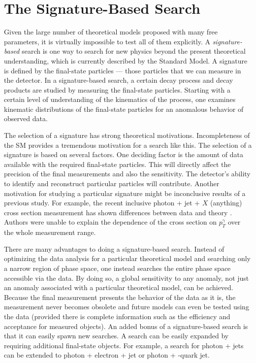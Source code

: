 \section{The Signature-Based Search}
Given the large number of theoretical models proposed with many free parameters, it is virtually impossible to test all of them explicitly. A \textit{signature-based} search is one way to search for new physics beyond the present theoretical understanding, which is currently described by the Standard Model. A signature is defined by the final-state particles --- those particles that we can measure in the detector. In a signature-based search, a certain decay process and decay products are studied by measuring the final-state particles. Starting with a certain level of understanding of the kinematics of the process, one examines kinematic distributions of the final-state particles for an anomalous behavior of observed data.

The selection of a signature has strong theoretical motivations. Incompleteness of the SM provides a tremendous motivation for a search like this. The selection of a signature is based on several factors. One deciding factor is the amount of data available with the required final-state particles. This will directly affect the precision of the final measurements and also the sensitivity. The detector's ability to identify and reconstruct particular particles will contribute. Another motivation for studying a particular signature might be inconclusive results of a previous study. For example, the recent inclusive photon + jet + $X$ (anything) cross section measurement has shown differences between data and theory \cite{pap:PhoJetCrosssection_D0}. Authors were unable to explain the dependence of the cross section on $p_{T}^{\gamma}$ over the whole measurement range.

There are many advantages to doing a signature-based search. Instead of optimizing the data analysis for a particular theoretical model and searching only a narrow region of phase space, one instead searches the entire phase space accessible via the data. By doing so, a global sensitivity to any anomaly, not just an anomaly associated with a particular theoretical model, can be achieved. Because the final measurement presents the behavior of the data as it is, the measurement never becomes obsolete and future models can even be tested using the data (provided there is complete information such as the efficiency and acceptance for measured objects). An added bonus of a signature-based search is that it can easily spawn new searches. A search can be easily expanded by requiring additional final-state objects. For example, a search for photon + jets can be extended to photon + electron + jet or photon + -quark jet.

